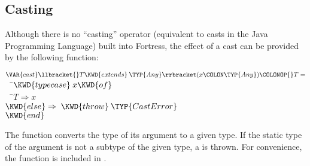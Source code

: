 %
%
%
%

\subsection{Casting}

Although there is no ``casting'' operator (equivalent to casts in the
Java Programming Language) built into Fortress, the effect of a cast
can be provided by the following function:
\begin{Fortress}
\(\VAR{cast}\llbracket{}T \KWD{extends}\mskip 4mu plus 4mu\TYP{Any}\rrbracket(x\COLON \TYP{Any})\COLONOP{}T = \)\\
{\tt~~}\pushtabs\=\+\(  \KWD{typecase}\mskip 4mu plus 4mu{x} \KWD{of}\)\\
{\tt~~}\pushtabs\=\+\(    T \Rightarrow x\)\\
\(    \KWD{else} \Rightarrow\;\KWD{throw}\mskip 4mu plus 4mu\TYP{CastError}\)\-\\\poptabs
\(  \KWD{end}\)\-\\\poptabs
\end{Fortress}
The function converts the type of its argument to a given type.  If the
static type of the argument is not a subtype of the given type, a
 is thrown.
For convenience, the function  is included in
\library.
